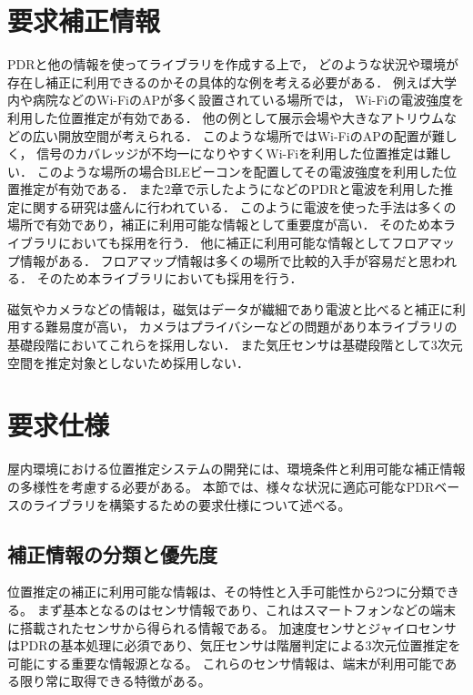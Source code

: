 
\section{要求補正情報}


PDRと他の情報を使ってライブラリを作成する上で，
どのような状況や環境が存在し補正に利用できるのかその具体的な例を考える必要がある．
例えば大学内や病院などのWi-FiのAPが多く設置されている場所では，
Wi-Fiの電波強度を利用した位置推定が有効である．
他の例として展示会場や大きなアトリウムなどの広い開放空間が考えられる．
このような場所ではWi-FiのAPの配置が難しく，
信号のカバレッジが不均一になりやすくWi-Fiを利用した位置推定は難しい．
このような場所の場合BLEビーコンを配置してその電波強度を利用した位置推定が有効である．
また2章で示したように\cite{pdr-wifi}\cite{pdr-ble}などのPDRと電波を利用した推定に関する研究は盛んに行われている．
このように電波を使った手法は多くの場所で有効であり，補正に利用可能な情報として重要度が高い．
そのため本ライブラリにおいても採用を行う．
他に補正に利用可能な情報としてフロアマップ情報がある．
フロアマップ情報は多くの場所で比較的入手が容易だと思われる．
そのため本ライブラリにおいても採用を行う．

磁気やカメラなどの情報は，磁気はデータが繊細であり電波と比べると補正に利用する難易度が高い，
カメラはプライバシーなどの問題があり本ライブラリの基礎段階においてこれらを採用しない．
また気圧センサは基礎段階として3次元空間を推定対象としないため採用しない．

\section{要求仕様}

屋内環境における位置推定システムの開発には、環境条件と利用可能な補正情報の多様性を考慮する必要がある。
本節では、様々な状況に適応可能なPDRベースのライブラリを構築するための要求仕様について述べる。

\subsection{補正情報の分類と優先度}

位置推定の補正に利用可能な情報は、その特性と入手可能性から2つに分類できる。
まず基本となるのはセンサ情報であり、これはスマートフォンなどの端末に搭載されたセンサから得られる情報である。
加速度センサとジャイロセンサはPDRの基本処理に必須であり、気圧センサは階層判定による3次元位置推定を可能にする重要な情報源となる。
これらのセンサ情報は、端末が利用可能である限り常に取得できる特徴がある。

